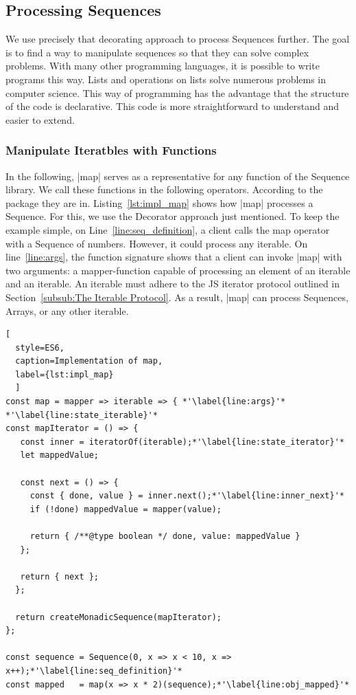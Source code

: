 \subsection{Processing Sequences}
\label{sec:Processing Sequences}
We use precisely that decorating approach to process Sequences further. 
The goal is to find a way to manipulate sequences so that they can solve 
complex problems. With many other programming languages, it is possible to write 
programs this way. Lists and operations on lists solve numerous problems in 
computer science. This way of programming has the advantage that the structure 
of the code is declarative. This code is more straightforward to understand 
and easier to extend.

\subsubsection{Manipulate Iteratbles with Functions}
\label{subsub:Manipulate Iteratbles with Functions}
In the following, |map| serves as a representative for any function of the
Sequence library. We call these functions in the following operators.
According to the package they are in.
Listing~\ref{lst:impl_map} shows how |map| processes a 
Sequence. For this, we use the Decorator approach just mentioned. To keep the 
example simple, on Line~\ref{line:seq_definition}, a client calls the map 
operator with a Sequence of numbers. However, it could process any iterable.
\newline
On line~\ref{line:args}, the function signature shows that a client can invoke 
|map| with two arguments: a mapper-function capable of processing an element of 
an iterable and an iterable. An iterable must adhere to the JS iterator protocol 
outlined in Section~\ref{subsub:The Iterable Protocol}. As a result, |map| can 
process Sequences, Arrays, or any other iterable. 

\begin{lstlisting}[
  style=ES6, 
  caption=Implementation of map,
  label={lst:impl_map}
  ]
const map = mapper => iterable => { *'\label{line:args}'*
*'\label{line:state_iterable}'*
const mapIterator = () => {
   const inner = iteratorOf(iterable);*'\label{line:state_iterator}'*
   let mappedValue;
 
   const next = () => {
     const { done, value } = inner.next();*'\label{line:inner_next}'*
     if (!done) mappedValue = mapper(value);
 
     return { /**@type boolean */ done, value: mappedValue }
   };
 
   return { next };
  };
 
  return createMonadicSequence(mapIterator);
};

const sequence = Sequence(0, x => x < 10, x => x++);*'\label{line:seq_definition}'*
const mapped   = map(x => x * 2)(sequence);*'\label{line:obj_mapped}'*
\end{lstlisting}

